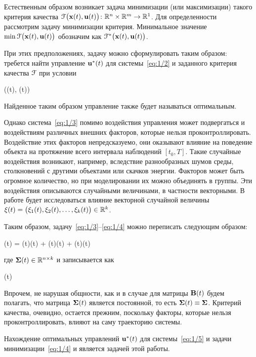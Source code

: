 Естественным образом возникает задача минимизации (или максимизации) такого критерия качества $\mathcal{F}\bigl(\mathbf{x}(t), \mathbf{u}(t)\bigr) \colon \mathbb{R}^{n} \times \mathbb{R}^{m} \to \mathbb{R}^{1}$. Для определенности рассмотрим задачу минимизации критерия. Минимальное значение $\min\mathcal{F}\bigl(\mathbf{x}(t), \mathbf{u}(t)\bigr)$ обозначим как $\mathcal{F}^{*}\bigl(\mathbf{x}(t), \mathbf{u}(t)\bigr)$.

При этих предположениях, задачу можно сформулировать таким образом: требется найти управление $\mathbf{u}^{*}(t)$ для системы~\ref{eq:1/2} и заданного критерия качества $\mathcal{F}$ при условии

    \funcF\bigl((t), (t)\bigr) \to \min {}
\eeq

Найденное таким образом управление также будет называться оптимальным.

\br

Однако система~\ref{eq:1/3} помимо воздействия управления может подвергаться и воздействиям различных внешних факторов, которые нельзя проконтроллировать. Воздействие этих факторов непредсказуемо, они оказывают влияние на поведение объекта на протяжение всего интервала наблюдений $[t_0, T]$. Такие случайные воздействия возникают, например, вследствие разнообразных шумов среды, столкновений с другими объектами или скачков энергии. Факторов может быть огромное количество, но при моделировании их можно объединять в группы. Эти воздействия описываются случайными величинами, в частности векторными. В работе будет исследоваться влияние векторной случайной величины $\mathbf{\xi}(t) = \bigl( \xi_1(t), \xi_2(t), \ldots, \xi_k(t) \bigr) \in \mathbb{R}^{k}$.

Таким образом, задачу~\ref{eq:1/3}--\ref{eq:1/4} можно переписать следующим образом:

    (t) = (t)(t) + (t)(t) + \m{\Sigma}(t)\m{\xi}(t) \text{,}
\eeq

где $\mathbf{\Sigma}(t) \in \mathbb{R}^{{n} \times {k}}$ и записывается как

\beqn
    \m{\Sigma}(t) \eqdef {} 
\eeqn

Впрочем, не нарушая общности, как и в случае для матрицы $\mathbf{B}(t)$ будем полагать, что матрица $\mathbf{\Sigma}(t)$ является постоянной, то есть $\mathbf{\Sigma}(t) \equiv \mathbf{\Sigma}$. Критерий качества, очевидно, остается прежним, поскольку факторы, которые нельзя проконтроллировать, влияют на саму траекторию системы.

Нахождение оптимальных управлений $\mathbf{u}^{*}(t)$ для системы~\ref{eq:1/5} и задачи минимизации~\ref{eq:1/4} и является задачей этой работы.
